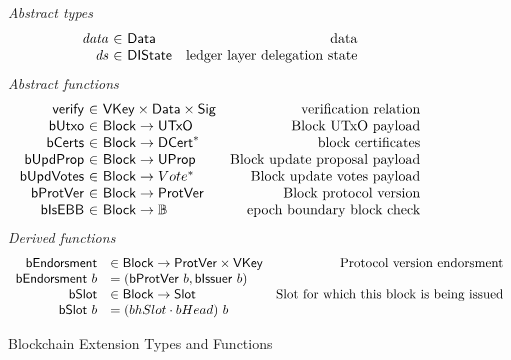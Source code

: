 \documentclass[11pt,a4paper]{article}
\newcommand{\var}[1]{\mathit{#1}}
\newcommand{\fun}[1]{\mathsf{#1}}
\newcommand{\type}[1]{\mathsf{#1}}
\newcommand{\seqof}[1]{#1^{*}}
\newcommand{\totalf}{\to}
\newcommand{\Slot}{\type{Slot}}
\newcommand{\Block}{\type{Block}}
\newcommand{\DCert}{\type{DCert}}
\newcommand{\VKey}{\type{VKey}}
\newcommand{\Sig}{\type{Sig}}
\newcommand{\Data}{\type{Data}}
\newcommand{\DelegState}{\type{DIState}}
\newcommand{\verifyname}{verify}
\newcommand{\isebbname}{bIsEBB}
\newcommand{\bcertsname}{bCerts}
\newcommand{\bissuername}{bIssuer}
\newcommand{\bissuer}[1]{\fun{\bissuername} ~ #1}
\begin{document}
\begin{figure}[ht]
  \emph{Abstract types}
  \begin{equation*}
  \begin{array}{r@{~\in~}lr}
    \var{data} & \Data    & \text{data}\\
    \var{ds} & \DelegState & \text{ledger layer delegation state}
  \end{array}
  \end{equation*}
  \emph{Abstract functions}
  \begin{equation*}
  \begin{array}{r@{~\in~}lr}
    \fun{\verifyname} & \VKey \times \Data \times \Sig
      & \text{verification relation} \\
    \fun{bUtxo} & \Block \totalf \UTxO & \text{Block UTxO payload} \\
    \fun{\bcertsname} & \Block \totalf \seqof{\DCert}
      & \text{block certificates} \\
    \fun{bUpdProp} & \Block \totalf \UProp & \text{Block update proposal payload} \\
    \fun{bUpdVotes} & \Block \totalf \seqof{Vote} & \text{Block update votes payload} \\
    \fun{bProtVer} & \Block \totalf \ProtVer & \text{Block protocol version} \\
    \fun{\isebbname} & \Block \totalf \mathbb{B} & \text{epoch boundary block check} \\
  \end{array}
  \end{equation*}
  \emph{Derived functions}
  \begin{equation*}
    \begin{array}{rlr}
      \fun{bEndorsment} & \in \Block \to \ProtVer \times \VKey & \text{Protocol version endorsment} \\
      \bendorsment{b} & = (\bprotver{b}, \bissuer{b}) \\
      \fun{\bslotname} & \in \Block \to \Slot & \text{Slot for which this block is being issued} \\
      \bslot{b} & = (\bhslotname \cdot \bheadname)~b
    \end{array}
  \end{equation*}

  \caption{Blockchain Extension Types and Functions}
  \label{fig:defs:chain-extension}
\end{figure}
\end{document}
